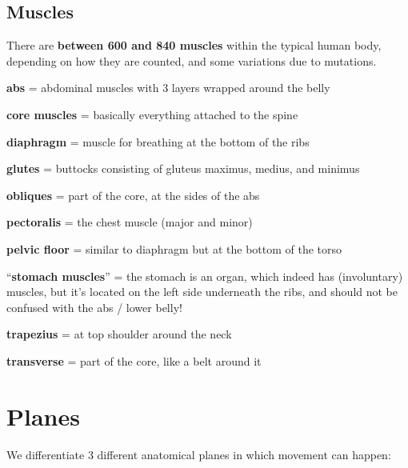 \subsection{Muscles}\label{subsec:muscles}

There are \textbf{between 600 and 840 muscles} within the typical human body, depending on how they are counted, and some variations due to mutations.

\begin{itemize*}
    \item \textbf{abs} = abdominal muscles with 3 layers wrapped around the belly
    \item \textbf{core muscles} = basically everything attached to the spine
    \item \textbf{diaphragm} = muscle for breathing at the bottom of the ribs
    \item \textbf{glutes} = buttocks consisting of gluteus maximus, medius, and minimus
    \item \textbf{obliques} = part of the core, at the sides of the abs
    \item \textbf{pectoralis} = the chest muscle (major and minor)
    \item \textbf{pelvic floor} = similar to diaphragm but at the bottom of the torso
    \item ``\textbf{stomach muscles}'' = the stomach is an organ, which indeed has (involuntary) muscles, but it's located on the left side underneath the ribs, and should not be confused with the abs / lower belly!
    \item \textbf{trapezius} = at top shoulder around the neck
    \item \textbf{transverse} = part of the core, like a belt around it
\end{itemize*}

\section{Planes}\label{sec:planes}


We differentiate 3 different anatomical planes in which movement can happen:

